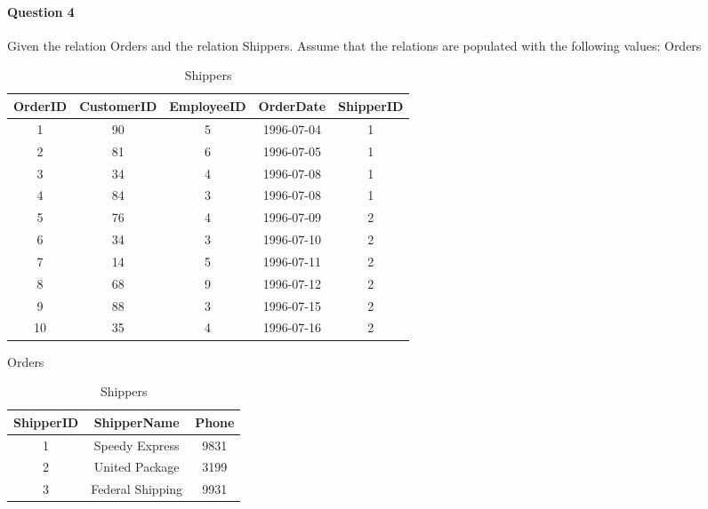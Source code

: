 \documentclass[10pt,a4paper]{report}
\begin{document}
\paragraph{Question 4}

Given the relation Orders and the relation Shippers. Assume that the relations are populated with the following values:
Orders			

\begin{table}[h!]
\centering
\begin{tabular}{|c|c|c|c|c|}
\hline                         										
OrderID 	&	CustomerID 	&	EmployeeID	&	OrderDate	&	ShipperID	\\	\hline	\hline
1			&	90			&	5			&	1996-07-04	&	1	\\	\hline
2			&	81			&	6			&	1996-07-05	&	1	\\	\hline
3			&	34			&	4			&	1996-07-08	&	1	\\	\hline	
4			&	84			&	3			&	1996-07-08	&	1	\\	\hline
5			&	76			&	4			&	1996-07-09	&	2	\\	\hline
6			&	34			&	3			&	1996-07-10	&	2	\\	\hline
7			&	14			&	5			&	1996-07-11	&	2	\\	\hline
8			&	68			&	9			&	1996-07-12	&	2	\\	\hline
9			&	88			&	3			&	1996-07-15	&	2	\\	\hline
10			&	35			&	4			&	1996-07-16	&	2	\\	\hline
\end{tabular}
\caption{Orders}
\label{Orders_Q4}
\medskip
\centering
\begin{tabular}{|c|c|c|}
\hline
ShipperID	&	ShipperName			&	Phone	\\	\hline	\hline
1			&	Speedy Express		&	9831	\\	\hline
2			&	United Package		&	3199	\\	\hline
3			&	Federal Shipping	&	9931	\\	\hline
\end{tabular}
\caption{Shippers}
\label{Shippers_Q4}
\end{table}
\end{document}
